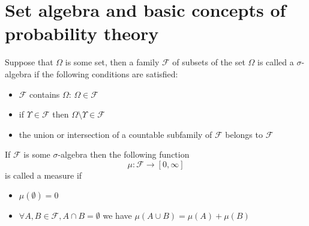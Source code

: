 \section{Set algebra and basic concepts of probability theory}

\begin{definition}
\label{def:sigma_algebra}
Suppose that $\Omega$ is some set, then a family
$\mathcal{F}$ of subsets of the set $\Omega$ is called
a $\sigma$-algebra if the following conditions are satisfied:
\begin{itemize}
\item $\mathcal{F}$ contains $\Omega$: $\Omega \in \mathcal{F}$
\item if $\Upsilon  \in \mathcal{F}$ then $\Omega \setminus \Upsilon
  \in \mathcal{F}$
\item the union or intersection of a countable subfamily of $\mathcal{F}$
  belongs to $\mathcal{F}$
\end{itemize}
\end{definition}

\begin{definition}[Measure]
\label{def:measure} 
If $\mathcal{F}$ is some $\sigma$-algebra then
the following function 
\[
\mu: \mathcal{F} \to \left[0, \infty\right]
\]
is called a measure if 
\begin{itemize}
\item $\mu\left(\emptyset\right) = 0$
\item $\forall A, B \in \mathcal{F}, A \cap B = \emptyset$ we have
$\mu\left(A \cup B\right) = \mu\left(A\right) +
  \mu\left(B\right)$ 
\end{itemize}
\end{definition}

